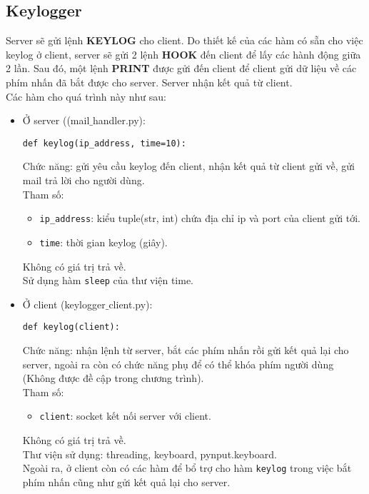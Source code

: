 \subsection{Keylogger}
Server sẽ gửi lệnh \textbf{KEYLOG} cho client. Do thiết kế của các hàm có sẵn cho việc keylog ở client, server sẽ gửi 2 lệnh \textbf{HOOK} đến client để lấy các hành động giữa 2 lần. Sau đó, một lệnh \textbf{PRINT} được gửi đến client để client gửi dữ liệu về các phím nhấn đã bắt được cho server. Server nhận kết quả từ client.\\
Các hàm cho quá trình này như sau:
\begin{itemize}
\item Ở server ((mail$\_$handler.py): 
\begin{lstlisting}
def keylog(ip_address, time=10):
\end{lstlisting}
Chức năng: gửi yêu cầu keylog đến client, nhận kết quả từ client gửi về, gửi mail trả lời cho người dùng.\\
Tham số: 
\begin{itemize}
\item \lstinline{ip_address}: kiểu tuple(str, int) chứa địa chỉ ip và port của client gửi tới.
\item \lstinline{time}: thời gian keylog (giây).
\end{itemize}
Không có giá trị trả về.\\
Sử dụng hàm \lstinline{sleep} của thư viện time.
\item Ở client (keylogger$\_$client.py):
\begin{lstlisting}
def keylog(client):
\end{lstlisting}
Chức năng: nhận lệnh từ server, bắt các phím nhấn rồi gửi kết quả lại cho server, ngoài ra còn có chức năng phụ để có thể khóa phím người dùng (Không được đề cập trong chương trình).\\
Tham số: 
\begin{itemize}
\item \lstinline{client}: socket kết nối server với client.
\end{itemize}
Không có giá trị trả về.\\
Thư viện sử dụng: threading, keyboard, pynput.keyboard.\\
Ngoài ra, ở client còn có các hàm để bổ trợ cho hàm \lstinline{keylog} trong việc bắt phím nhấn cũng như gửi kết quả lại cho server.


\end{itemize}
